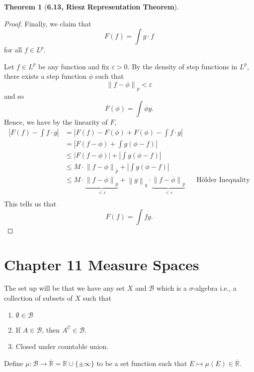 \documentclass[12pt]{article}
\newcommand{\R}{\mathbb{R}}
\newcommand{\C}{\mathscr{C}}
\newcommand{\B}{\mathcal{B}}
\newcommand{\norm}[1]{\left\lVert #1 \right\rVert}
\newcommand{\abs}[1]{\left\lvert #1 \right\rvert}
\renewcommand{\epsilon}{\varepsilon}
\theoremstyle{definition}
\newtheorem*{thm}{Theorem}
\begin{document}
\begin{thm}[\textbf{6.13, Riesz Representation Theorem}]
\begin{proof}
            Finally, we claim that 
                \[
                    F(f) = \int g \cdot f  
                \]
            for all \( f \in L^p \).

            Let \( f \in L^p \) be any function and fix \( \epsilon > 0 \). 
            By the density of step functions in \( L^p \), there exists a step function \( \phi \) such that 
                \[
                    \norm{f - \phi}_{p} < \epsilon  
                \]
            and so
                \[
                    F(\phi) = \int \phi g.  
                \]
            Hence, we have by the linearity of \( F \),
                \begin{align*}
                    \abs{F(f) - \int f\cdot g} &= \abs{F(f) - F(\phi) + F(\phi) - \int f \cdot g} \\
                    &= \abs{F(f - \phi)+ \int g(\phi - f)} \\
                    &\leq \abs{F(f - \phi)} + \abs{\int g(\phi - f)} \\
                    &\leq M \cdot \norm{f - \phi}_{p} + \abs{\int g(\phi - f)}  \\
                    &\leq  M \cdot \underbrace{\norm{f - \phi}_{p}}_{<\epsilon} + \norm{g}_{q} \cdot \underbrace{\norm{f - \phi}_{p}}_{<\epsilon} && \text{H\"{o}lder Inequality} \\
                \end{align*}
            This tells us that 
                \[
                    F(f) = \int fg.
                \]
        \end{proof}

\end{thm}

\section*{Chapter 11 Measure Spaces}

The set up will be that we have any set \( X \) and \( \mathcal{B} \) which is a \(\sigma\)-algebra i.e., a collection of subsets of \( X \) such that 
    \begin{enumerate}
        \item \(\emptyset \in \mathcal{B} \)
        \item If \( A \in \mathcal{B} \), then \( A^{\C} \in \mathcal{B}\).
        \item Closed under countable union. 
    \end{enumerate}
Define \( \mu: \B \to \overline{\R} = \R \cup \{ \pm \infty\} \) to be a set function such that \( E \mapsto \mu(E) \in \overline{\R}\).
\end{document}
